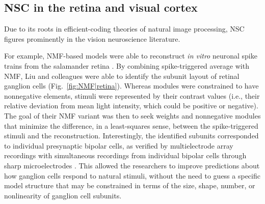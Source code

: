 \subsection*{NSC in the retina and visual cortex}

Due to its roots in efficient-coding theories of natural image processing,
\ac{NSC} figures prominently in the vision neuroscience literature.

For example, \ac{NMF}-based models were able to reconstruct
\emph{in vitro} neuronal spike trains from the salamander retina 
\cite{Onken2016,Liu2017}.
By combining spike-triggered average with \ac{NMF},
Liu and colleagues \cite{Liu2017} were able to identify the subunit layout
of retinal ganglion cells
(Fig.~\ref{fig:NMF|retina}).
Whereas modules were constrained to have nonnegative elements,
stimuli were represented by their contrast values (i.e., their relative deviation from mean light intensity, which could be positive or negative).
The goal of their \ac{NMF} variant was then to seek weights and nonnegative modules
that minimize the difference, in a least-squares sense, between the spike-triggered
stimuli and the reconstruction.
Interestingly, the identified subunits corresponded to 
individual presynaptic bipolar cells,
as verified by multielectrode array recordings with simultaneous recordings from
individual bipolar cells through sharp microelectrodes \cite{Liu2017}.
This allowed the researchers to improve predictions about how ganglion cells respond
to natural stimuli, without the need to guess a specific model structure that may be constrained in terms of the size, shape, number, or nonlinearity of 
ganglion cell subunits.

